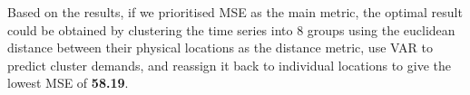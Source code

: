 \documentclass[nonblindrev,msom]{informs3} %
\begin{document}

\noindent Based on the results, if we prioritised MSE as the main metric, the optimal result could be obtained by clustering the time series into 8 groups using the euclidean distance between their physical locations as the distance metric, use VAR to predict cluster demands, and reassign it back to individual locations to give the lowest MSE of \textbf{58.19}. 

%
%
%
\end{document}
